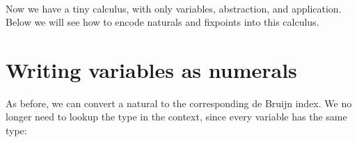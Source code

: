 \begin{fence}
\begin{code}
\AgdaSpace{}%
\AgdaSpace{}%
\<%
\\
%
\\[\AgdaEmptyExtraSkip]%
%
\>[2]\AgdaSpace{}%
\AgdaSymbol{:}\AgdaSpace{}%
\AgdaSpace{}%
\AgdaSymbol{\{}\AgdaSymbol{\}}\<%
\\
\>[2][@{}l@{\AgdaIndent{0}}]%
\>[4]\AgdaSpace{}%
\AgdaSpace{}%
\AgdaSpace{}%
\<%
\\
%
\>[4]%
\>[148I]\AgdaSpace{}%
\AgdaSpace{}%
\<%
\\
\>[.][@{}l@{}]\<[148I]%
\>[6]\AgdaComment{------}\<%
\\
%
\>[4]\AgdaSpace{}%
\AgdaSpace{}%
\AgdaSpace{}%
\<%
\end{code}
\end{fence}

Now we have a tiny calculus, with only variables, abstraction, and
application. Below we will see how to encode naturals and fixpoints into
this calculus.

\hypertarget{writing-variables-as-numerals}{%
\section{Writing variables as
numerals}\label{writing-variables-as-numerals}}

As before, we can convert a natural to the corresponding de Bruijn
index. We no longer need to lookup the type in the context, since every
variable has the same type:

